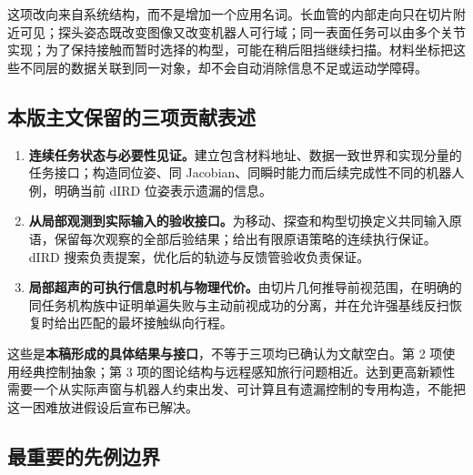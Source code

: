 \documentclass[11pt,a4paper]{article}
\theoremstyle{cn}
\begin{document}
这项改向来自系统结构，而不是增加一个应用名词。长血管的内部走向只在切片附近可见；探头姿态既改变图像又改变机器人可行域；同一表面任务可以由多个关节实现；为了保持接触而暂时选择的构型，可能在稍后阻挡继续扫描。材料坐标把这些不同层的数据关联到同一对象，却不会自动消除信息不足或运动学障碍。

\subsection{本版主文保留的三项贡献表述}

\begin{enumerate}
\item \textbf{连续任务状态与必要性见证。}建立包含材料地址、数据一致世界和实现分量的任务接口；构造同位姿、同 Jacobian、同瞬时能力而后续完成性不同的机器人例，明确当前 dIRD 位姿表示遗漏的信息。
\item \textbf{从局部观测到实际输入的验收接口。}为移动、探查和构型切换定义共同输入原语，保留每次观察的全部后验结果；给出有限原语策略的连续执行保证。dIRD 搜索负责提案，优化后的轨迹与反馈管验收负责保证。
\item \textbf{局部超声的可执行信息时机与物理代价。}由切片几何推导前视范围，在明确的同任务机构族中证明单遍失败与主动前视成功的分离，并在允许强基线反扫恢复时给出匹配的最坏接触纵向行程。
\end{enumerate}

这些是\textbf{本稿形成的具体结果与接口}，不等于三项均已确认为文献空白。第 2 项使用经典控制抽象；第 3 项的图论结构与远程感知旅行问题相近。达到更高新颖性需要一个从实际声窗与机器人约束出发、可计算且有遗漏控制的专用构造，不能把这一困难放进假设后宣布已解决。

\subsection{最重要的先例边界}
\end{document}
